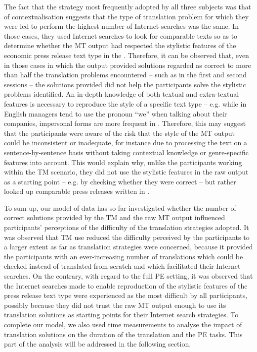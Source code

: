 \documentclass[output=paper]{LSP/langsci}
\begin{document}
The fact that the strategy most frequently adopted by all three subjects was that of contextualisation suggests that the type of translation problem for which they were led to perform the highest number of Internet searches was the same. In those cases, they used Internet searches to look for comparable texts so as to determine whether the MT output had respected the stylistic features of the economic press release text type in the . Therefore, it can be observed that, even in those cases in which the output provided solutions regarded as correct to more than half the translation problems encountered -- such as in the first and second sessions -- the solutions provided did not help the participants solve the stylistic problems identified. An in-depth knowledge of both textual and extra-textual features is necessary to reproduce the style of a specific text type -- e.g. while in English managers tend to use the pronoun ``we'' when talking about their companies, impersonal forms are more frequent in . Therefore, this may suggest that the participants were aware of the risk that the style of the MT output could be inconsistent or inadequate, for instance due to processing the text on a sentence-by-sentence basis without taking contextual knowledge or genre-specific features into account. This would explain why, unlike the participants working within the TM scenario, they did not use the stylistic features in the raw output as a starting point -- e.g. by checking whether they were correct -- but rather looked up comparable press releases written in .


To sum up, our model of data  has so far investigated whether the number of correct solutions provided by the TM and the raw MT output influenced participants' perceptions of the difficulty of the translation strategies adopted. It was observed that TM use reduced the difficulty perceived by the participants to a larger extent as far as translation strategies were concerned, because it provided the participants with an ever-increasing number of translations which could be checked instead of translated from scratch and which facilitated their Internet searches. On the contrary, with regard to the full PE setting, it was observed that the Internet searches made to enable reproduction of the stylistic features of the press release text type were experienced as the most difficult by all participants, possibly because they did not trust the raw MT output enough to use its translation solutions as starting points for their Internet search strategies. To complete our model, we also used time measurements to analyse the impact of translation solutions on the duration of the translation and the PE tasks. This part of the analysis will be addressed in the following section.
\end{document}
